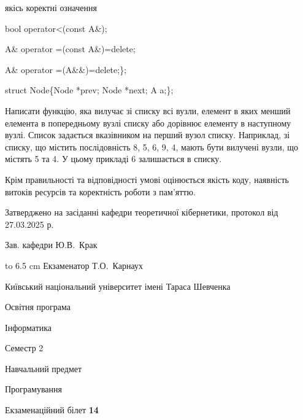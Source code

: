 \documentclass[12pt, ukrainian]{article}
\begin{document}
{\quad  якісь коректні означення 

\quad  bool operator<(const A\&); 

\quad A\& operator =(const A\&)=delete; 

\quad  A\& operator =(A\&\&)=delete;\};

struct Node\{Node *prev; Node *next; A a;\};

Написати функцію, яка вилучає зі списку всі вузли, елемент в яких менший елемента в попередньому вузлі списку або дорівнює елементу в наступному вузлі. Список задається вказівником на перший вузол списку. Наприклад, зі списку, що містить послідовність 8, 5, 6, 9, 4, мають бути вилучені вузли, що містять 5 та 4. У цьому прикладі 6 залишається в списку.

Крім правильності та відповідності умові оцінюється якість коду, наявність витоків ресурсів та коректність роботи з пам'яттю. 

}
{\smallskip\smallskip \begin {scriptsize} Затверджено на засіданні кафедри теоретичної кібернетики, протокол   від   27.03.2025 р.\par\smallskip\smallskip\smallskip\smallskip
{\parbox {6.5 cm} {Зав. кафедри \dotfill Ю.В.~Крак}}\hspace {0.7cm} {\hbox to 6.5 cm { Екзаменатор \dotfill Т.О.~Карнаух}} \end{scriptsize}}
\newpage
{{\begin {scriptsize}\par
{ \center  Київський національний університет імені Тараса Шевченка \par}
{\parbox {5 cm}{Освітня програма \hfill}{\parbox {7 cm}{Інформатика\hfill}}\parbox {6 cm}{\hfill Семестр 2}}\par
{\parbox {5 cm} {Навчальний предмет \hfill}\parbox {7 cm}{Програмування \hfill}\parbox {6cm}{\hfill}\par}\vspace{-15pt} \end{scriptsize}}{\center Екзаменаційний білет \No \textbf { 14 }\par}}
\end{document}

